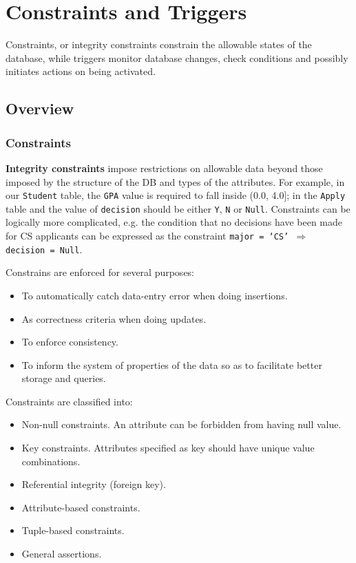 \ifx\PREAMBLE\undefined


\fi
\chapter{Constraints and Triggers}
Constraints, or integrity constraints constrain the allowable states of the database, while triggers monitor database changes, check conditions and possibly initiates actions on being activated. 
\section{Overview}
\subsection{Constraints}
\textbf{Integrity constraints} impose restrictions on allowable data beyond those imposed by the structure of the DB and types of the attributes. For example, in our \texttt{Student} table, the \texttt{GPA} value is required to fall inside (0.0, 4.0]; in the \texttt{Apply} table and the value of \texttt{decision} should be either \texttt{Y}, \texttt{N} or \texttt{Null}. Constraints can be logically more complicated, e.g. the condition that no decisions have been made for CS applicants can be expressed as the constraint \texttt{major = `CS' $\Rightarrow$ decision = Null}. 

Constrains are enforced for several purposes:
\begin{itemize}
\item To automatically catch data-entry error when doing insertions. 
\item As correctness criteria when doing updates. 
\item To enforce consistency.
\item To inform the system of properties of the data so as to facilitate better storage and queries.
\end{itemize}

Constraints are classified into:
\begin{itemize}
\item Non-null constraints. An attribute can be forbidden from having null value.
\item Key constraints. Attributes specified as key should have unique value combinations. 
\item Referential integrity (foreign key).
\item Attribute-based constraints.
\item Tuple-based constraints.
\item General assertions.
\end{itemize}

